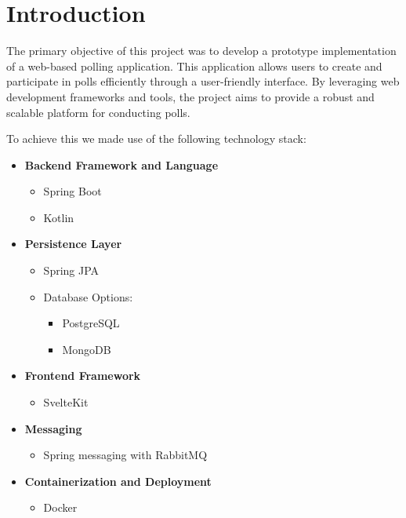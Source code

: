 \section{Introduction}
\label{sec:introduction}

The primary objective of this project was to develop a prototype implementation of a web-based polling application.
This application allows users to create and participate in polls efficiently through a user-friendly interface.
By leveraging web development frameworks and tools, the project aims to provide a robust and scalable platform for conducting polls.

To achieve this we made use of the following technology stack:

\begin{itemize}
    \item \textbf{Backend Framework and Language}
    \begin{itemize}
        \item Spring Boot
        \item Kotlin
    \end{itemize}

    \item \textbf{Persistence Layer}
    \begin{itemize}
        \item Spring JPA
        \item Database Options:
        \begin{itemize}
            \item PostgreSQL
            \item MongoDB
        \end{itemize}
    \end{itemize}

    \item \textbf{Frontend Framework}
    \begin{itemize}
        \item SvelteKit
    \end{itemize}

    \item \textbf{Messaging}
    \begin{itemize}
        \item Spring messaging with RabbitMQ
    \end{itemize}

    \item \textbf{Containerization and Deployment}
    \begin{itemize}
        \item Docker
    \end{itemize}
\end{itemize}

